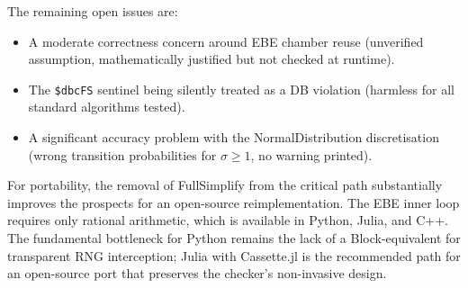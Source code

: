 \documentclass[12pt,a4paper]{article}
\theoremstyle{critical}
\theoremstyle{remark}
\theoremstyle{verified}
\begin{document}
The remaining open issues are:
\begin{itemize}
\item A moderate correctness concern around EBE chamber reuse (unverified
  assumption, mathematically justified but not checked at runtime).
\item The \texttt{\$dbcFS} sentinel being silently treated as a DB violation
  (harmless for all standard algorithms tested).
\item A significant accuracy problem with the NormalDistribution discretisation
  (wrong transition probabilities for $\sigma \geq 1$, no warning printed).
\end{itemize}

For portability, the removal of FullSimplify from the critical path
substantially improves the prospects for an open-source reimplementation.  The
EBE inner loop requires only rational arithmetic, which is available in Python,
Julia, and C++.  The fundamental bottleneck for Python remains the lack of a
Block-equivalent for transparent RNG interception; Julia with Cassette.jl is the
recommended path for an open-source port that preserves the checker's
non-invasive design.
\end{document}
